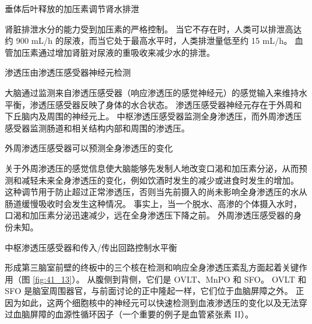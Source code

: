 垂体后叶释放的加压素调节肾水排泄

肾脏排泄水分的能力受到加压素的严格控制。 当它不存在时，人类可以排泄高达约 900 mL/h 的尿液，而当它处于最高水平时，人类排泄量低至约 15 mL/h。 血管加压素通过增加肾脏对尿液的重吸收来减少水的排泄。

渗透压由渗透压感受器神经元检测

大脑通过监测来自渗透压感受器（响应渗透压的感觉神经元）的感觉输入来维持水平衡，渗透压感受器反映了身体的水合状态。 渗透压感受器神经元存在于外周和下丘脑内及周围的神经元上。 中枢渗透压感受器监测全身渗透压，而外周渗透压感受器监测肠道和相关结构内部和周围的渗透压。

外周渗透压感受器可以预测全身渗透压的变化

关于外周渗透压的感觉信息使大脑能够先发制人地改变口渴和加压素分泌，从而预测和减轻未来全身渗透压的变化，例如饮酒时发生的减少或进食时发生的增加。 这种调节用于防止超过正常渗透压，否则当先前摄入的尚未影响全身渗透压的水从肠道缓慢吸收时会发生这种情况。 事实上，当一个脱水、高渗的个体摄入水时，口渴和加压素分泌迅速减少，远在全身渗透压下降之前。 外周渗透压感受器的身份未知。

中枢渗透压感受器和传入/传出回路控制水平衡

形成第三脑室前壁的终板中的三个核在检测和响应全身渗透压紊乱方面起着关键作用（图 \ref{fig:41_13}）。 
从腹侧到背侧，它们是 OVLT、MnPO 和 SFO。 OVLT 和 SFO 是脑室周围器官，与前面讨论的正中隆起一样，它们位于血脑屏障之外。 正因为如此，这两个细胞核中的神经元可以快速检测到血液渗透压的变化以及无法穿过血脑屏障的血源性循环因子（一个重要的例子是血管紧张素 II）。

